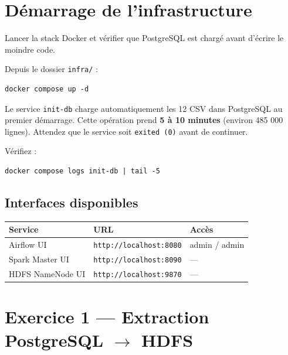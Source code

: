 \documentclass[11pt,a4paper]{article}
\begin{document}
\section{Démarrage de l'infrastructure}

\begin{objectif}
Lancer la stack Docker et vérifier que PostgreSQL est chargé avant d'écrire le moindre code.
\end{objectif}

Depuis le dossier \texttt{infra/} :
\begin{lstlisting}[style=bash, numbers=none]
docker compose up -d
\end{lstlisting}

\begin{attention}
Le service \texttt{init-db} charge automatiquement les 12 CSV dans PostgreSQL au premier démarrage. Cette opération prend \textbf{5 à 10 minutes} (environ 485 000 lignes). Attendez que le service soit \texttt{exited (0)} avant de continuer.
\end{attention}

Vérifiez :
\begin{lstlisting}[style=bash, numbers=none]
docker compose logs init-db | tail -5
\end{lstlisting}

\subsection*{Interfaces disponibles}

\begin{center}
\begin{tabular}{lll}
  \toprule
  \textbf{Service}  & \textbf{URL}                       & \textbf{Accès} \\
  \midrule
  Airflow UI        & \texttt{http://localhost:8080}      & admin / admin \\
  Spark Master UI   & \texttt{http://localhost:8090}      & — \\
  HDFS NameNode UI  & \texttt{http://localhost:9870}      & — \\
  \bottomrule
\end{tabular}
\end{center}

\section{Exercice 1 — Extraction PostgreSQL \texorpdfstring{$\rightarrow$}{→} HDFS}
\end{document}
